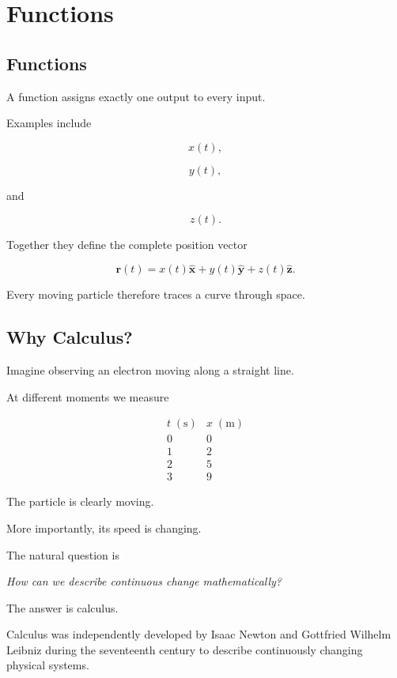 \section{Functions}
\label{sec:functions}

\subsection{Functions}

A function assigns exactly one output to every input.

Examples include

\[
x(t),
\]

\[
y(t),
\]

and

\[
z(t).
\]

Together they define the complete position vector

\[
\boxed{
	\mathbf r(t)
	=
	x(t)\hat{\mathbf x}
	+
	y(t)\hat{\mathbf y}
	+
	z(t)\hat{\mathbf z}.
}
\]

Every moving particle therefore traces a curve through space.


\subsection{Why Calculus?}

Imagine observing an electron moving along a straight line.

At different moments we measure

\[
\begin{array}{c|c}
	t\;(\mathrm{s}) & x\;(\mathrm{m})\\
	\hline
	0 & 0\\
	1 & 2\\
	2 & 5\\
	3 & 9
\end{array}
\]

The particle is clearly moving.

More importantly, its speed is changing.

The natural question is

\begin{center}
	\emph{How can we describe continuous change mathematically?}
\end{center}

The answer is calculus.

Calculus was independently developed by Isaac Newton and Gottfried Wilhelm
Leibniz during the seventeenth century to describe continuously changing
physical systems.

